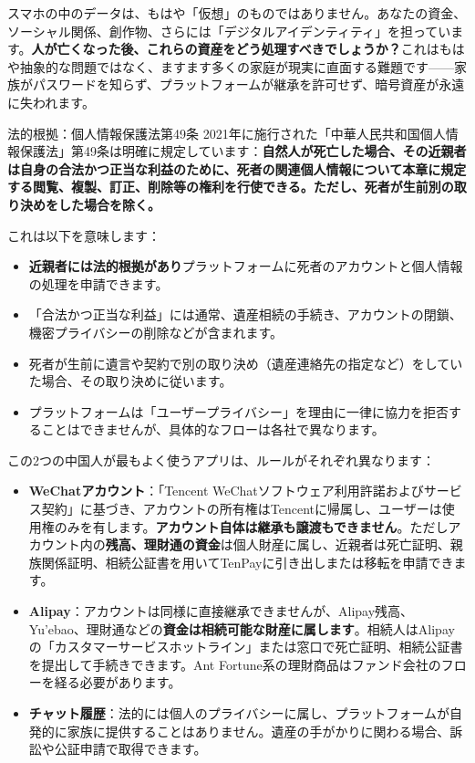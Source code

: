 
スマホの中のデータは、もはや「仮想」のものではありません。あなたの資金、ソーシャル関係、創作物、さらには「デジタルアイデンティティ」を担っています。\textbf{人が亡くなった後、これらの資産をどう処理すべきでしょうか？}これはもはや抽象的な問題ではなく、ますます多くの家庭が現実に直面する難題です——家族がパスワードを知らず、プラットフォームが継承を許可せず、暗号資産が永遠に失われます。

\begin{tcbinfo}{法的根拠：個人情報保護法第49条}
2021年に施行された「中華人民共和国個人情報保護法」第49条は明確に規定しています：\textbf{自然人が死亡した場合、その近親者は自身の合法かつ正当な利益のために、死者の関連個人情報について本章に規定する閲覧、複製、訂正、削除等の権利を行使できる。ただし、死者が生前別の取り決めをした場合を除く。}

これは以下を意味します：

\begin{itemize}
  \item \textbf{近親者には法的根拠があり}プラットフォームに死者のアカウントと個人情報の処理を申請できます。
  \item 「合法かつ正当な利益」には通常、遺産相続の手続き、アカウントの閉鎖、機密プライバシーの削除などが含まれます。
  \item 死者が生前に遺言や契約で別の取り決め（遺産連絡先の指定など）をしていた場合、その取り決めに従います。
  \item プラットフォームは「ユーザープライバシー」を理由に一律に協力を拒否することはできませんが、具体的なフローは各社で異なります。
\end{itemize}

\end{tcbinfo}


この2つの中国人が最もよく使うアプリは、ルールがそれぞれ異なります：

\begin{itemize}
  \item \textbf{WeChatアカウント}：「Tencent WeChatソフトウェア利用許諾およびサービス契約」に基づき、アカウントの所有権はTencentに帰属し、ユーザーは使用権のみを有します。\textbf{アカウント自体は継承も譲渡もできません}。ただしアカウント内の\textbf{残高、理財通の資金}は個人財産に属し、近親者は死亡証明、親族関係証明、相続公証書を用いてTenPayに引き出しまたは移転を申請できます。
  \item \textbf{Alipay}：アカウントは同様に直接継承できませんが、Alipay残高、Yu'ebao、理財通などの\textbf{資金は相続可能な財産に属します}。相続人はAlipayの「カスタマーサービスホットライン」または窓口で死亡証明、相続公証書を提出して手続きできます。Ant Fortune系の理財商品はファンド会社のフローを経る必要があります。
  \item \textbf{チャット履歴}：法的には個人のプライバシーに属し、プラットフォームが自発的に家族に提供することはありません。遺産の手がかりに関わる場合、訴訟や公証申請で取得できます。
\end{itemize}

